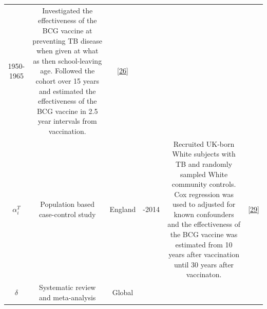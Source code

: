 \documentclass[11pt,twoside]{bristolthesis}
\begin{document}
\begin{longtable}[]{@{}cccccc@{}}
\begin{minipage}[t]{0.07\columnwidth}
  1950-1965\strut
  \end{minipage} & \begin{minipage}[t]{0.31\columnwidth}\centering
  Investigated the effectiveness of the BCG vaccine
  at preventing TB disease when given at what as
  then school-leaving age. Followed the cohort over
  15 years and estimated the effectiveness of the
  BCG vaccine in 2.5 year intervals from
  vaccination.\strut
  \end{minipage} & \begin{minipage}[t]{0.10\columnwidth}\centering
  {[}\protect\hyperlink{ref-Hart1972}{26}{]}\strut
  \end{minipage}\tabularnewline
  \begin{minipage}[t]{0.19\columnwidth}\centering
  \(\alpha_i^T\)\strut
  \end{minipage} & \begin{minipage}[t]{0.09\columnwidth}\centering
  Population
  based
  case-control
  study\strut
  \end{minipage} & \begin{minipage}[t]{0.07\columnwidth}\centering
  England\strut
  \end{minipage} & \begin{minipage}[t]{0.07\columnwidth}\centering
  2002-2014\strut
  \end{minipage} & \begin{minipage}[t]{0.31\columnwidth}\centering
  Recruited UK-born White subjects with TB and
  randomly sampled White community controls. Cox
  regression was used to adjusted for known
  confounders and the effectiveness of the BCG
  vaccine was estimated from 10 years after
  vaccination until 30 years after vaccinaton.\strut
  \end{minipage} & \begin{minipage}[t]{0.10\columnwidth}\centering
  {[}\protect\hyperlink{ref-Mangtani2017}{29}{]}\strut
  \end{minipage}\tabularnewline
  \begin{minipage}[t]{0.19\columnwidth}\centering
  \(\delta\)\strut
  \end{minipage} & \begin{minipage}[t]{0.09\columnwidth}\centering
  Systematic
  review and
  meta-analysis\strut
  \end{minipage} & \begin{minipage}[t]{0.07\columnwidth}\centering
  Global\strut
  \end{minipage} & \begin{minipage}[t]{0.07\columnwidth}\centering

\end{minipage}
\end{longtable}
\end{document}
